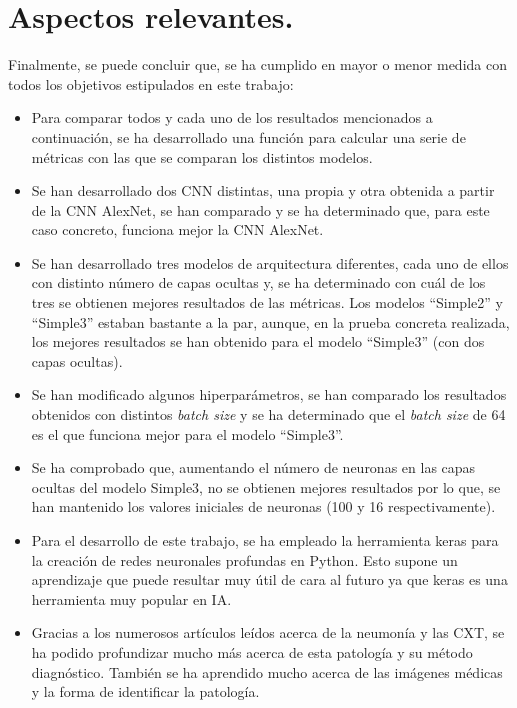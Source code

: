 
\section{Aspectos relevantes.}

Finalmente, se puede concluir que, se ha cumplido en mayor o menor medida con todos los objetivos estipulados en este trabajo:
\begin{itemize}
    \item Para comparar todos y cada uno de los resultados mencionados a continuación, se ha desarrollado una función para calcular una serie de métricas con las que se comparan los distintos modelos.
    \item Se han desarrollado dos CNN distintas, una propia y otra obtenida a partir de la CNN AlexNet, se han comparado y se ha determinado que, para este caso concreto, funciona mejor la CNN AlexNet.
    \item Se han desarrollado tres modelos de arquitectura diferentes, cada uno de ellos con distinto número de capas ocultas y, se ha determinado con cuál de los tres se obtienen mejores resultados de las métricas. Los modelos ``Simple2'' y ``Simple3'' estaban bastante a la par, aunque, en la prueba concreta realizada, los mejores resultados se han obtenido para el modelo ``Simple3'' (con dos capas ocultas).
    \item Se han modificado algunos hiperparámetros, se han comparado los resultados obtenidos con distintos \textit{batch size} y se ha determinado que el \textit{batch size} de 64 es el que funciona mejor para el modelo ``Simple3''.
    \item Se ha comprobado que, aumentando el número de neuronas en las capas ocultas del modelo Simple3, no se obtienen mejores resultados por lo que, se han mantenido los valores iniciales de neuronas (100 y 16 respectivamente).
    \item Para el desarrollo de este trabajo, se ha empleado la herramienta keras para la creación de redes neuronales profundas en Python. Esto supone un aprendizaje que puede resultar muy útil de cara al futuro ya que keras es una herramienta muy popular en IA.
    \item Gracias a los numerosos artículos leídos acerca de la neumonía y las CXT, se ha podido profundizar mucho más acerca de esta patología y su método diagnóstico. También se ha aprendido mucho acerca de las imágenes médicas y la forma de identificar la patología. 
    
\end{itemize}

